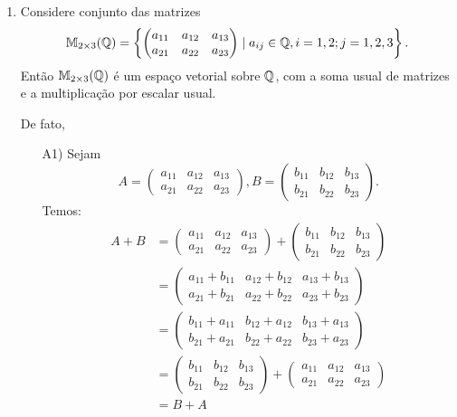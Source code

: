 \begin{exemplo}
\begin{enumerate}[label={\arabic*})]
    \item Considere conjunto das matrizes
          \[
            \mathbb{M}_{2 \times 3}(\mathbb{Q}) = \left\{\begin{pmatrix}a_{11} & a_{12} & a_{13}\\a_{21} & a_{22} & a_{23}\end{pmatrix} \mid a_{ij} \in \mathbb{Q}, i = 1, 2; j = 1, 2, 3\right\}.
          \]
          Então $\mathbb{M}_{2\times 3}(\mathbb{Q})$ é um espaço vetorial sobre $\mathbb{Q}$, com a soma usual de matrizes e a multiplicação por escalar usual.
          \begin{solucao}
            De fato,
            \begin{itemize}
              \item[A1)] Sejam
                \[
                  A = \begin{pmatrix} a_{11} & a_{12} & a_{13}\\a_{21} & a_{22} & a_{23}\end{pmatrix},
                  B = \begin{pmatrix} b_{11} & b_{12} & b_{13}\\b_{21} & b_{22} & b_{23}\end{pmatrix}.
                \]
                Temos:
                \begin{align*}
                  A + B & = \begin{pmatrix} a_{11} & a_{12} & a_{13}\\a_{21} & a_{22} & a_{23}\end{pmatrix} + \begin{pmatrix} b_{11} & b_{12} & b_{13}\\b_{21} & b_{22} & b_{23}\end{pmatrix}
                  \\ &= \begin{pmatrix} a_{11} + b_{11} & a_{12} + b_{12} & a_{13} + b_{13}\\a_{21} + b_{21} & a_{22} + b_{22} & a_{23} + b_{23}\end{pmatrix}
                  \\ &= \begin{pmatrix} b_{11} + a_{11} & b_{12} + a_{12} & b_{13} + a_{13}\\b_{21} + a_{21} & b_{22} + a_{22} & b_{23} + a_{23}\end{pmatrix}
                  \\ &= \begin{pmatrix} b_{11} & b_{12} & b_{13}\\b_{21} & b_{22} & b_{23}\end{pmatrix} + \begin{pmatrix} a_{11} & a_{12} & a_{13}\\a_{21} & a_{22} & a_{23}\end{pmatrix}
                  \\ &= B + A
                \end{align*}


\end{itemize}
\end{solucao}
\end{enumerate}
\end{exemplo}
